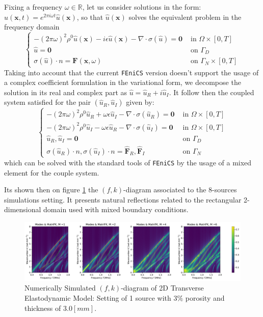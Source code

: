 Fixing a frequency $\omega \in \mathbb{R}$, let us consider solutions in the form: $u(\mathbf{x},t) = e^{2 \pi i \omega t}\hat{u}(\mathbf{x})$, so that $\hat{u}(\mathbf{x})$ solves the equivalent problem in the frequency domain
\begin{equation*}
    \left \{
    \begin{array}{ccc}
        -(2\pi \omega)^2 \rho^0 \hat{u}(\mathbf{x}) - i \epsilon \hat{u}(\mathbf{x}) - \nabla \cdot \sigma(\hat{u}) = \mathbf{0} & \text{ in } \Omega \times [0,T] \\
        \hat{u} = \mathbf{0} & \text{ on } \Gamma_D\\
        \sigma(\hat{u}) \cdot n = \mathbf{F}(\mathbf{x}, \omega) & \text{ on }\Gamma_N \times [0,T]
    \end{array}
    \right .
\end{equation*}
Taking into account that the current \texttt{FEniCS} version doesn't support the usage of a complex coefficient formulation in the variational form, we decompose the solution in its real and complex part as $\hat{u} = \hat{u}_R + i \hat{u}_I$. It follow then the coupled system satisfied for the pair $(\hat{u}_R, \hat{u}_I)$ given by:
\begin{equation*}
    \left \{
    \begin{array}{cc}
        -(2\pi \omega)^2 \rho^0 \hat{u}_R +  \omega \epsilon \hat{u}_I - \nabla \cdot \sigma (\hat{u}_R) = \mathbf{0} & \text{ in }\Omega \times [0,T] \\
        -(2\pi \omega)^2 \rho^0 \hat{u}_I - \omega \epsilon \hat{u}_R - \nabla \cdot \sigma (\hat{u}_I) = \mathbf{0} & \text{ in }\Omega \times [0, T] \\
        \hat{u}_R, \hat{u}_I = \mathbf{0} & \text{ on } \Gamma_D \\
        \sigma(\hat{u}_R)\cdot n, \sigma(\hat{u}_I)\cdot n = \hat{\mathbf{F}}_R, \hat{\mathbf{F}}_I & \text{ on }\Gamma_N
    \end{array}
    \right.
\end{equation*}
which can be solved with the standard tools of \texttt{FEniCS} by the usage of a mixed element for the couple system.

Its shown then on figure \ref{FK-DiagramFreqS8P12M28} the $(f,k)$-diagram associated to the 8-sources simulations setting. It presents natural reflections related to the rectangular 2-dimensional domain used with mixed boundary conditions.
\begin{figure}[!h]
	\centering
	\includegraphics[width=\textwidth]{images/FreqMultSous/2DMixedP12TransIsoFKW28M400_y.pdf}
	\caption{Numerically Simulated $(f,k)$-diagram of 2D Transverse Elastodynamic Model: Setting of 1 source with $3\%$ porosity and thickness of $3.0 [mm]$.}
	\label{FK-DiagramFreqS8P12M28}
\end{figure}

